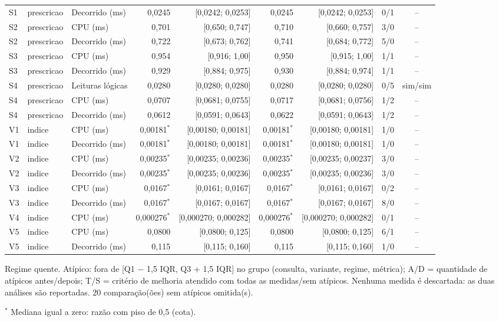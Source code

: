 {\begin{tabular}{lllrrrrrc}
S1 & prescricao & Decorrido (ms) & 0,0245 & [0,0242; 0,0253] & 0,0245 & [0,0242; 0,0253] & 0/1 & -- \\
S2 & prescricao & CPU (ms) & 0,701 & [0,650; 0,747] & 0,710 & [0,660; 0,757] & 3/0 & -- \\
S2 & prescricao & Decorrido (ms) & 0,722 & [0,673; 0,762] & 0,741 & [0,684; 0,772] & 5/0 & -- \\
S3 & prescricao & CPU (ms) & 0,954 & [0,916; 1,00] & 0,950 & [0,915; 1,00] & 1/1 & -- \\
S3 & prescricao & Decorrido (ms) & 0,929 & [0,884; 0,975] & 0,930 & [0,884; 0,974] & 1/1 & -- \\
S4 & prescricao & Leituras lógicas & 0,0280 & [0,0280; 0,0280] & 0,0280 & [0,0280; 0,0280] & 0/5 & sim/sim \\
S4 & prescricao & CPU (ms) & 0,0707 & [0,0681; 0,0755] & 0,0717 & [0,0681; 0,0756] & 1/2 & -- \\
S4 & prescricao & Decorrido (ms) & 0,0612 & [0,0591; 0,0643] & 0,0622 & [0,0591; 0,0643] & 1/2 & -- \\
V1 & indice & CPU (ms) & 0,00181$^{*}$ & [0,00180; 0,00181] & 0,00181$^{*}$ & [0,00180; 0,00181] & 1/0 & -- \\
V1 & indice & Decorrido (ms) & 0,00181$^{*}$ & [0,00180; 0,00181] & 0,00181$^{*}$ & [0,00180; 0,00181] & 1/0 & -- \\
V2 & indice & CPU (ms) & 0,00235$^{*}$ & [0,00235; 0,00236] & 0,00235$^{*}$ & [0,00235; 0,00237] & 3/0 & -- \\
V2 & indice & Decorrido (ms) & 0,00235$^{*}$ & [0,00235; 0,00236] & 0,00235$^{*}$ & [0,00235; 0,00236] & 3/0 & -- \\
V3 & indice & CPU (ms) & 0,0167$^{*}$ & [0,0161; 0,0167] & 0,0167$^{*}$ & [0,0161; 0,0167] & 0/2 & -- \\
V3 & indice & Decorrido (ms) & 0,0167$^{*}$ & [0,0167; 0,0167] & 0,0167$^{*}$ & [0,0167; 0,0167] & 8/0 & -- \\
V4 & indice & CPU (ms) & 0,000276$^{*}$ & [0,000270; 0,000282] & 0,000276$^{*}$ & [0,000270; 0,000282] & 0/1 & -- \\
V5 & indice & CPU (ms) & 0,0800 & [0,0800; 0,125] & 0,0800 & [0,0800; 0,125] & 6/1 & -- \\
V5 & indice & Decorrido (ms) & 0,115 & [0,115; 0,160] & 0,115 & [0,115; 0,160] & 1/0 & -- \\
\bottomrule
\end{tabular}\par
\vspace{3pt}
\begin{minipage}{\linewidth}\footnotesize
Regime quente. Atípico: fora de [Q1 $-$ 1,5 IQR, Q3 + 1,5 IQR] no grupo (consulta, variante, regime, métrica); A/D = quantidade de atípicos antes/depois; T/S = critério de melhoria atendido com todas as medidas/sem atípicos. Nenhuma medida é descartada: as duas análises são reportadas. 20 comparação(ões) sem atípicos omitida(s).\par
$^{*}$ Mediana igual a zero: razão com piso de 0,5 (cota).
\end{minipage}
}
